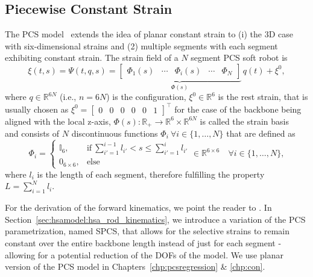 \subsection{Piecewise Constant Strain}
The \gls{PCS} model~\citep{renda2016discrete, renda2018discrete} extends the idea of planar constant strain to (i) the 3D case with six-dimensional strains and (2) multiple segments with each segment exhibiting constant strain. 
The strain field of a $N$ segment \gls{PCS} soft robot is
\begin{equation}
    \xi(t,s) = \Psi(t,q,s) = \underbrace{\begin{bmatrix}
        \Phi_1(s) & \cdots & \Phi_i(s) & \cdots & \Phi_N
    \end{bmatrix}}_{\Phi(s)} \, q(t) + \xi^0,
\end{equation}
where $q \in \mathbb{R}^{6N}$ (i.e., $n=6N$) is the configuration,
$\xi^0 \in \mathbb{R}^6$ is the rest strain, that is usually chosen as $\xi^0 = \begin{bmatrix}
    0 & 0 & 0 & 0 & 0 & 1
\end{bmatrix}^\top$ for the case of the backbone being aligned with the local z-axis,
$\Phi(s): \mathbb{R_+} \to \mathbb{R}^6 \times \mathbb{R}^{6N}$ is called the strain basis~\citep{renda2020geometric, mathew2025reduced} and consists of
$N$ discontinuous functions $\Phi_i \: \forall i \in \{ 1,\dots, N \}$ that are defined as
\begin{equation}
    \Phi_i = \begin{cases}
        \mathbb{I}_{6}, & \text{if} \: \sum_{i'=1}^{i-1} l_{i'} < s \leq \sum_{i'= 1}^{i} l_{i'} \\
        0_{6\times 6}, & \text{else}
    \end{cases} \in \mathbb{R}^{6 \times 6} \quad \forall i \in \{ 1,\dots, N \},
\end{equation}
where $l_i$ is the length of each segment, therefore fulfilling the property $L = \sum_{i=1}^{N} l_i$.

For the derivation of the forward kinematics, we point the reader to \citet{renda2018discrete}. In Section~\ref{sec:hsamodel:hsa_rod_kinematics}, we introduce a variation of the \gls{PCS} parametrization, named \gls{SPCS}, that allows for the selective strains to remain constant over the entire backbone length instead of just for each segment - allowing for a potential reduction of the \glspl{DOF} of the model.
We use planar version of the \gls{PCS} model in Chapters~\ref{chp:pcsregression} \& \ref{chp:con}.


